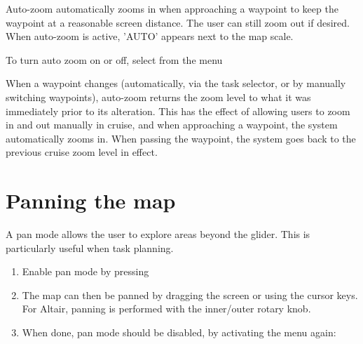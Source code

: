 \documentclass[a4paper,12pt]{refrep}
\begin{document}
Auto-zoom automatically zooms in when approaching a waypoint to keep
the waypoint at a reasonable screen distance.  The user can still zoom
out if desired.  When auto-zoom is active, 'AUTO' appears next to the
map scale.  

To turn auto zoom on or off, select from the menu
\begin{quote}
\blink{} 
\end{quote}

When a waypoint changes (automatically, via the task selector, or by
manually switching waypoints), auto-zoom returns the zoom level to what
it was immediately prior to its alteration.  This has the effect of
allowing users to zoom in and out manually in cruise, and when
approaching a waypoint, the system automatically zooms in.  When
passing the waypoint, the system goes back to the previous cruise zoom
level in effect.

%
%

\section{Panning the map}

A pan mode allows the user to explore areas beyond the glider.  This
is particularly useful when task planning.
\begin{enumerate}
\item Enable pan mode by pressing 
\begin{quote}
\blink{}
\end{quote}

\item The map can then be panned by dragging the screen or using the cursor
  keys.  For Altair, panning is performed with the inner/outer rotary knob.
\item When done, pan mode should be disabled, by activating the menu again:
\begin{quote}
\blink{}
\end{quote}

\end{enumerate} 
\end{document}
